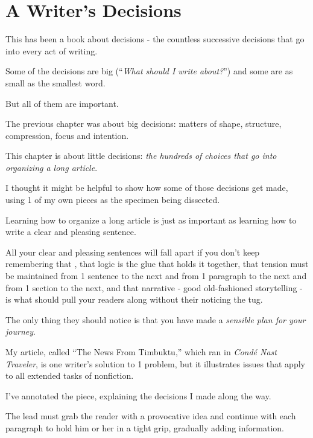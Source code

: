 \documentclass{book}
\numberwithin{equation}{section}
\begin{document}

\chapter{A Writer's Decisions}

This has been a book about decisions - the countless successive decisions that go into every act of writing.

Some of the decisions are big (``\textit{What should I write about?}'') and some are as small as the smallest word.

But all of them are important.

%
The previous chapter was about big decisions: matters of shape, structure, compression, focus and intention.

This chapter is about little decisions: \textit{the hundreds of choices that go into organizing a long article}.

I thought it might be helpful to show how some of those decisions get made, using 1 of my own pieces as the specimen being dissected.

%
Learning how to organize a long article is just as important as learning how to write a clear and pleasing sentence.

All your clear and pleasing sentences will fall apart if you don't keep remembering that , that logic is the glue that holds it together, that tension must be maintained from 1 sentence to the next and from 1 paragraph to the next and from 1 section to the next, and that narrative - good old-fashioned storytelling - is what should pull your readers along without their noticing the tug.

The only thing they should notice is that you have made a \textit{sensible plan for your journey}.


My article, called ``The News From Timbuktu,'' which ran in \textit{Cond\'e Nast Traveler}, is one writer's solution to 1 problem, but it illustrates issues that apply to all extended tasks of nonfiction.

I've annotated the piece, explaining the decisions I made along the way.

%

The lead must grab the reader with a provocative idea and continue with each paragraph to hold him or her in a tight grip, gradually adding information.
\end{document}
